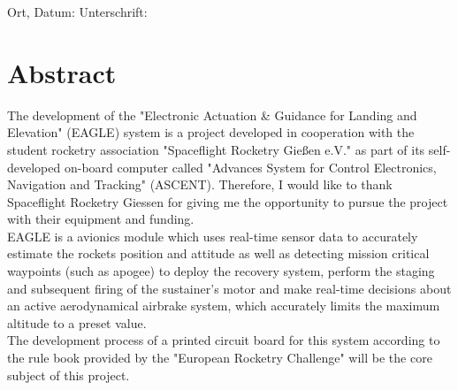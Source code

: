 \documentclass[fontsize=11pt,%
twoside,%
BCOR          = 8mm, %
DIV           = 11,  %
titlepage     = off,%
index=totoc,%
xcolor        = pdftex,%
dvipsnames,%
bibliography  = totoc,%
bibliography = numbered, %
listof        = notnumbered]{scrreprt}
\begin{document}
\noindent Ort, Datum: \dotfill \hspace{3mm} Unterschrift: \dotfill 

\newpage


\chapter*{Abstract}
The development of the "Electronic Actuation \& Guidance for Landing and Elevation" (EAGLE) system is a project developed in cooperation with the student rocketry association "Spaceflight Rocketry Gießen e.V." as part of its self-developed on-board computer called "Advances System for Control Electronics, Navigation and Tracking" (ASCENT). Therefore, I would like to thank Spaceflight Rocketry Giessen for giving me the opportunity to pursue the project with their equipment and funding.\\
EAGLE is a avionics module which uses real-time sensor data to accurately estimate the rockets position and attitude as well as detecting mission critical waypoints (such as apogee) to deploy the recovery system, perform the staging and subsequent firing of the sustainer's motor and make real-time decisions about an active aerodynamical airbrake system, which accurately limits the maximum altitude to a preset value.\\
The development process of a printed circuit board for this system according to the rule book provided by the "European Rocketry Challenge" will be the core subject of this project.


\newpage
\tableofcontents
\cleardoublepage

\listoffigures
\cleardoublepage

\listoftables
\cleardoublepage
\end{document}
